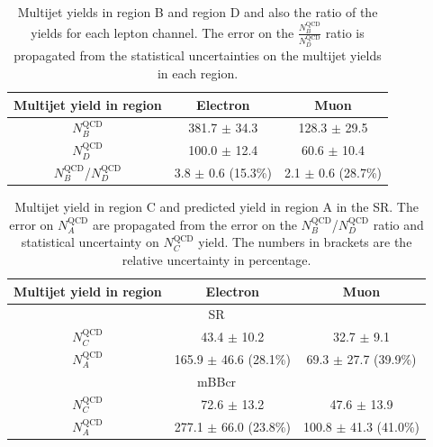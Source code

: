 \begin{table}
\begin{center}
\begin{tabular}{c|c|c}
Multijet yield in region              & Electron                & Muon   \\      
\hline
$N_B^\text{QCD}$                      & 381.7 $\pm$ 34.3      & 128.3 $\pm$ 29.5 \\
$N_D^\text{QCD}$                      & 100.0 $\pm$ 12.4      & 60.6 $\pm$ 10.4  \\
\hline
$N_{B}^\text{QCD}$/$N_{D}^\text{QCD}$     & 3.8 $\pm$ 0.6 (15.3\%) & 2.1 $\pm$ 0.6 (28.7\%)   \\
\end{tabular}
\end{center}
\caption{Multijet yields in region B and region D and also the ratio of the yields for each lepton channel. The error
on the $\frac{N_B^\text{QCD}}{N_D^\text{QCD}}$ ratio is propagated from the statistical uncertainties on the multijet yields in each region.}
\label{tab:boosted_bkgd_abcd_ratio}
\end{table}
 
\begin{table}[!htbp]
\begin{center}
\begin{tabular}{c|c|c}
Multijet yield in region & Electron  & Muon  \\  
\hline
\multicolumn{3}{c}{SR} \\
\hline
$N_C^\text{QCD}$         & 43.4  $\pm$ 10.2 & 32.7 $\pm$ 9.1 \\
$N_A^\text{QCD}$         & 165.9 $\pm$ 46.6 (28.1\%) & 69.3 $\pm$ 27.7 (39.9\%) \\
\hline
\multicolumn{3}{c}{mBBcr} \\
\hline
$N_C^\text{QCD}$       & 72.6  $\pm$ 13.2 & 47.6  $\pm$ 13.9  \\
$N_A^\text{QCD}$       & 277.1 $\pm$ 66.0 (23.8\%) & 100.8 $\pm$ 41.3 (41.0\%)  \\
\hline
\end{tabular}
\end{center}
\caption{Multijet yield in region C and predicted yield in region A in the SR. The error on $N_A^\text{QCD}$
are propagated from the error on the $N_B^\text{QCD}$/$N_D^\text{QCD}$ ratio and statistical uncertainty on $N_C^\text{QCD}$ yield.
The numbers in brackets are the relative uncertainty in percentage.}
\label{tab:boosted_bkgd_abcd_yield}
\end{table}
 
